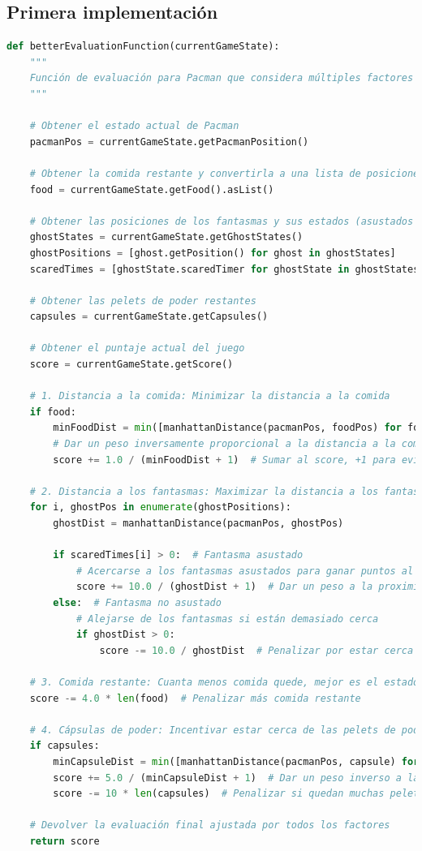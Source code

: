 \documentclass{report}
\begin{document}
        \subsection*{Primera implementación}
          \begin{lstlisting}[language=Python, caption=Implementación inicial de la función de evaluación]
def betterEvaluationFunction(currentGameState):
    """
    Función de evaluación para Pacman que considera múltiples factores del estado de juego.
    """

    # Obtener el estado actual de Pacman
    pacmanPos = currentGameState.getPacmanPosition()
    
    # Obtener la comida restante y convertirla a una lista de posiciones
    food = currentGameState.getFood().asList()
    
    # Obtener las posiciones de los fantasmas y sus estados (asustados o no)
    ghostStates = currentGameState.getGhostStates()
    ghostPositions = [ghost.getPosition() for ghost in ghostStates]
    scaredTimes = [ghostState.scaredTimer for ghostState in ghostStates]
    
    # Obtener las pelets de poder restantes
    capsules = currentGameState.getCapsules()
    
    # Obtener el puntaje actual del juego
    score = currentGameState.getScore()

    # 1. Distancia a la comida: Minimizar la distancia a la comida
    if food:
        minFoodDist = min([manhattanDistance(pacmanPos, foodPos) for foodPos in food])
        # Dar un peso inversamente proporcional a la distancia a la comida
        score += 1.0 / (minFoodDist + 1)  # Sumar al score, +1 para evitar división por 0

    # 2. Distancia a los fantasmas: Maximizar la distancia a los fantasmas (si no están asustados)
    for i, ghostPos in enumerate(ghostPositions):
        ghostDist = manhattanDistance(pacmanPos, ghostPos)
        
        if scaredTimes[i] > 0:  # Fantasma asustado
            # Acercarse a los fantasmas asustados para ganar puntos al comérselos
            score += 10.0 / (ghostDist + 1)  # Dar un peso a la proximidad a fantasmas asustados
        else:  # Fantasma no asustado
            # Alejarse de los fantasmas si están demasiado cerca
            if ghostDist > 0:
                score -= 10.0 / ghostDist  # Penalizar por estar cerca de un fantasma peligroso

    # 3. Comida restante: Cuanta menos comida quede, mejor es el estado
    score -= 4.0 * len(food)  # Penalizar más comida restante

    # 4. Cápsulas de poder: Incentivar estar cerca de las pelets de poder
    if capsules:
        minCapsuleDist = min([manhattanDistance(pacmanPos, capsule) for capsule in capsules])
        score += 5.0 / (minCapsuleDist + 1)  # Dar un peso inverso a la distancia a las pelets
        score -= 10 * len(capsules)  # Penalizar si quedan muchas pelets sin recoger

    # Devolver la evaluación final ajustada por todos los factores
    return score
          \end{lstlisting}
\end{document}
